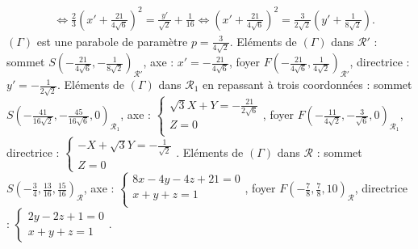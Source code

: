 {{\begin{align*}
 &\Leftrightarrow\frac{2}{3}\left(x'+\frac{21}{4\sqrt{6}}\right)^2=\frac{y'}{\sqrt{2}}+\frac{1}{16}\Leftrightarrow\left(x'+\frac{21}{4\sqrt{6}}\right)^2=\frac{3}{2\sqrt{2}}\left(y'+\frac{1}{8\sqrt{2}}\right).
\end{align*}
$\left(\Gamma\right)$ est une parabole de paramètre $p=\frac{3}{4\sqrt{2}}$.
Eléments de $(\Gamma)$ dans $\mathcal{R}'$ : sommet $S\left(-\frac{21}{4\sqrt{6}},-\frac{1}{8\sqrt{2}}\right)_{\mathcal{R}'}$, axe : $x'=-\frac{21}{4\sqrt{6}}$, foyer $F\left(-\frac{21}{4\sqrt{6}},\frac{1}{4\sqrt{2}}\right)_{\mathcal{R}'}$, directrice : $y'=-\frac{1}{2\sqrt{2}}$.
Eléments de $(\Gamma)$ dans $\mathcal{R}_1$ en repassant à trois coordonnées : sommet $S\left(-\frac{41}{16\sqrt{2}},-\frac{45}{16\sqrt{6}},0\right)_{\mathcal{R}_1}$, axe : $\left\{
\begin{array}{l}
\sqrt{3}X+Y=-\frac{21}{2\sqrt{6}}\\
Z=0\\
\end{array}
\right.$, foyer $F\left(-\frac{11}{4\sqrt{2}},-\frac{3}{\sqrt{6}},0\right)_{\mathcal{R}_1}$, directrice : $\left\{
\begin{array}{l}
-X+\sqrt{3}Y=-\frac{1}{\sqrt{2}}\\
Z=0
\end{array}
\right.$.
Eléments de $(\Gamma)$ dans $\mathcal{R}$ : sommet $S\left(-\frac{3}{4},\frac{13}{16},\frac{15}{16}\right)_{\mathcal{R}}$, axe : $\left\{
\begin{array}{l}
8x-4y-4z+21=0\\
x+y+z=1\\
\end{array}
\right.$, foyer $F\left(-\frac{7}{8},\frac{7}{8},10\right)_{\mathcal{R}}$, directrice : $\left\{
\begin{array}{l}
2y-2z+1=0\\
x+y+z=1
\end{array}
\right.$.}
}
